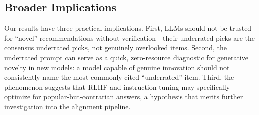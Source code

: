 \subsection{Broader Implications}
\label{sec:implications}

Our results have three practical implications. First, LLMs should not be trusted for ``novel'' recommendations without verification---their underrated picks are the consensus underrated picks, not genuinely overlooked items. Second, the underrated prompt can serve as a quick, zero-resource diagnostic for generative novelty in new models: a model capable of genuine innovation should not consistently name the most commonly-cited ``underrated'' item. Third, the \metapop phenomenon suggests that RLHF and instruction tuning may specifically optimize for popular-but-contrarian answers, a hypothesis that merits further investigation into the alignment pipeline.
